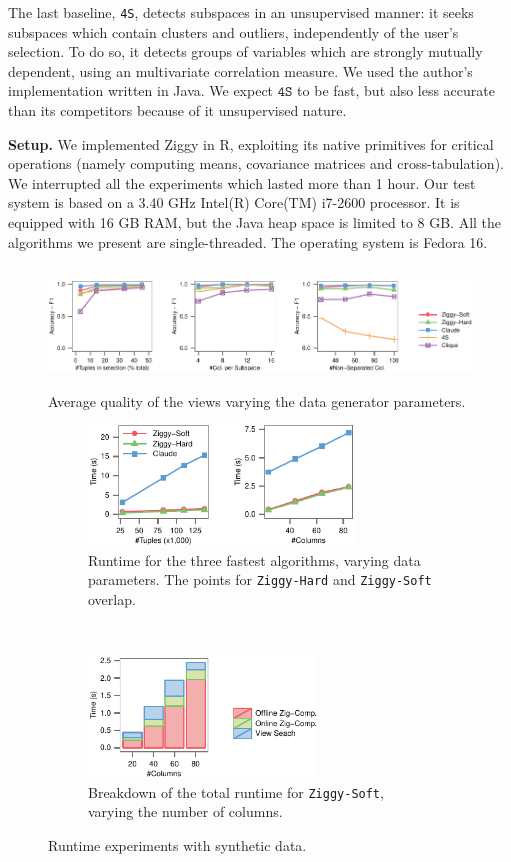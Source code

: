 The last baseline, \texttt{4S}, detects subspaces in an unsupervised manner: it
seeks subspaces which contain clusters and outliers, independently of the
user's selection. To do so, it detects groups of variables which are strongly
mutually dependent, using an multivariate correlation measure. We used the
author's implementation written in Java. We expect $\texttt{4S}$ to be fast,
but also less accurate than its competitors because of it unsupervised nature.

\textbf{Setup.} We implemented Ziggy in R, exploiting its native primitives for critical
operations (namely computing means, covariance matrices and cross-tabulation).
We interrupted all the experiments which lasted more than 1 hour. Our test
system is based on a 3.40 GHz Intel(R) Core(TM) i7-2600 processor. It is
equipped with 16 GB RAM, but the Java heap space is limited to 8 GB. All the
algorithms we present are single-threaded. The operating system is Fedora 16.

\begin{figure}[t!]
  \centering
  \includegraphics[height=3.2cm]{Plots/Synth-Accuracy}
  \caption{Average quality of the views varying the data generator parameters.}
  \label{pic:synthquali}
\end{figure}
\begin{figure}[t!]
    \centering
    \begin{subfigure}[b]{0.5\textwidth}
        \centering
    \includegraphics[height=3.2cm]{Plots/Synth-Runtime}
    \caption{Runtime for the three fastest algorithms, varying data parameters.
    The points for \texttt{Ziggy-Hard} and \texttt{Ziggy-Soft} overlap.}
    \label{pic:genruntime}
    \end{subfigure}
    ~~
    \begin{subfigure}[b]{0.45\textwidth}
        \centering
        \includegraphics[height=3.2cm]{Plots/Synth-TimeDetail}
        \caption{Breakdown of the total runtime for \texttt{Ziggy-Soft},
        varying the number of columns.}
    \label{pic:detruntime}
    \end{subfigure}
  \label{pic:syntruntime}
    \caption{Runtime experiments with synthetic data.}
\end{figure}

